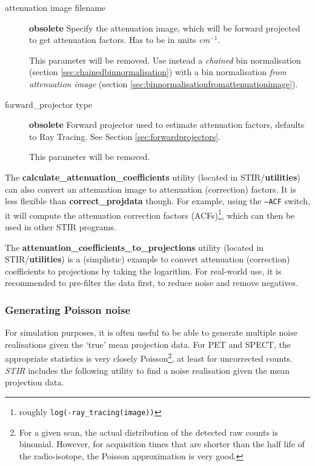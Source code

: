 \documentclass{article}
\begin{document}
{{\begin{description}
\item[attenuation image filename] \textbf{obsolete}
Specify the attenuation image, which will be forward projected 
to get attenuation factors. Has to be in units \textit{cm}$^{\mathit{-1}}$.


This parameter will be removed. Use instead a \textit{chained} 
bin normalisation (section \ref{sec:chainedbinnormalisation}) 
with a bin normalisation 
\textit{from attenuation image} (section \ref{sec:binnormalisationfromattenuationimage}).


\item[forward\_projector type] \textbf{obsolete}
Forward projector used to estimate attenuation factors, defaults 
to Ray Tracing. See Section \ref{sec:forwardprojectors}.

This parameter will be removed.
\end{description}

The \textbf{calculate\_attenuation\_coefficients} utility (located in STIR/\textbf{utilities})
can also convert an attenuation image to attenuation (correction) factors. It is less
flexible than \textbf{correct\_projdata} though. For example, using the \texttt{--ACF} switch,
it will compute the attenuation correction factors (ACFs)\footnote{roughly
\texttt{log(-ray\_tracing(image))}}, which can then be used in other STIR programs.


The \textbf{attenuation\_coefficients\_to\_projections} utility 
(located in STIR/\textbf{utilities}) is a (simplistic) example to convert
attenuation (correction) coefficients to projections by taking the logarithm.
For real-world use, it is recommended to pre-filter the data first, to reduce noise
and remove negatives.


\subsubsection{
Generating Poisson noise}

For simulation purposes, it is often useful to be able to generate 
multiple noise realisations given the `true' mean projection data. 
For PET and SPECT, the appropriate statistics is very closely 
Poisson\footnote{{\small For a given scan, the actual distribution of 
the detected raw counts is binomial. However, for acquisition 
times that are shorter than the half life of the radio-isotope, 
the Poisson approximation is very good.}}, 
at least for uncorrected counts. \textit{STIR} includes the following 
utility to find a noise realisation given the mean projection 
data.


}}
\end{document}
